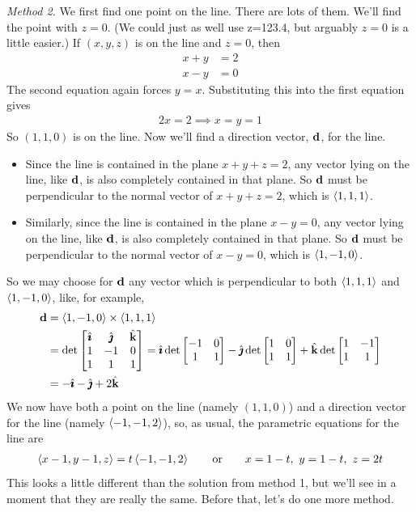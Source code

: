 \begin{eg}
\smallskip
\noindent\emph{Method 2.} We first find one point on the line. There
are lots of them. We'll find the point with $z=0$. (We could just as well
use z=123.4, but arguably $z=0$ is a little easier.) If  $(x,y,z)$ is 
on the line and $z=0$, then
\begin{align*}
x+y&=2\\
x-y&=0
\end{align*}
The second equation again forces $y=x$. Substituting this into the first 
equation gives
\begin{align*}
2x=2 \implies x=y=1
\end{align*}
So $(1,1,0)$ is on the line. Now we'll find a direction vector, $\mathbf{d}$,
for the line. 
\begin{itemize}
\item 
Since the line is contained in the plane $x+y+z=2$,
any vector lying on the line, like $\mathbf{d}$, is also completely contained
in that plane. So $\mathbf{d}$ must be perpendicular to the normal vector of
$x+y+z=2$, which is $\left< 1,1,1\right> $. 
\item
Similarly, since the line is 
contained in the plane $x-y=0$, any vector lying on the line, like $\mathbf{d}$, is also completely contained in that plane.  So $\mathbf{d}$ must be perpendicular to 
the normal vector of $x-y=0$, which is $\left< 1,-1,0\right> $. 
\end{itemize}
So we may choose for
$\mathbf{d}$ any vector which is perpendicular to both $\left< 1,1,1\right> $ and 
$\left< 1,-1,0\right>$, like, for example,
\begin{align*}
\mathbf{d}&=\left< 1,-1,0\right> \times\left< 1,1,1\right> \\
&=\det\left[ \begin{matrix}\hat{\pmb{\imath}} &\hat{\pmb{\jmath}}&\hat{\mathbf{k}}\\ 1&-1&0\\ 1&1&1\end{matrix}\right]
=\hat{\pmb{\imath}}\det\left[\begin{matrix}-1&0\\1&1\end{matrix}\right]
-\hat{\pmb{\jmath}}\det\left[\begin{matrix}1&0\\ 1&1\end{matrix}\right]
+\hat{\mathbf{k}}\det\left[\begin{matrix}1&-1\\ 1&1\end{matrix}\right]\\
&=-\hat{\pmb{\imath}}-\hat{\pmb{\jmath}}+2\hat{\mathbf{k}}
\end{align*}
We now have both a point on the line (namely $(1,1,0)$) and a direction vector for the line (namely $\left< -1,-1,2\right> $),
so, as usual, the parametric equations for the line are
\begin{align*}
\left< x-1,y-1,z\right> =t\left< -1,-1,2\right> \qquad\text{or}\qquad
x=1-t,\ y=1-t,\ z=2t
\end{align*}
This looks a little different than the solution from method 1, but we'll see in a moment that they are really the same. Before that, let's do one more method. 


\end{eg}
